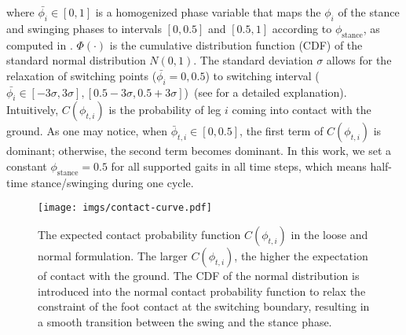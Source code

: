 where $\bar{\phi_i} \in [ 0, 1 ]$ is a homogenized phase variable that maps the $\phi_i$ of the stance and swinging phases to intervals $[0, 0.5]$ and $[0.5, 1]$ according to $\phi_{\text{stance}}$, as computed in . $\Phi(\cdot)$ is the cumulative distribution function (CDF) of the standard normal distribution $N(0, 1)$. The standard deviation $\sigma$ allows for the relaxation of switching points ($\bar{\phi_i} = 0, 0.5$) to switching interval ($\bar{\phi_i} \in [-3 \sigma, 3 \sigma], [0.5 -3 \sigma, 0.5 + 3 \sigma]$)~(see  for a detailed explanation). 
Intuitively, $C(\phi_{t,i})$ is the probability of leg $i$ coming into contact with the ground.
As one may notice, when $\bar{\phi}_{t,i} \in [0, 0.5]$, the first term of $C(\phi_{t,i})$ is dominant; otherwise, the second term becomes dominant.
In this work, we set a constant $\phi_{\text{stance}}=0.5$ for all supported gaits in all time steps, which means half-time stance/swinging during one cycle.
\begin{figure}
    \centering
    \texttt{[image: imgs/contact-curve.pdf]}
    \caption{\small The expected contact probability function $C(\phi_{t,i})$ in the loose and normal formulation. The larger $C(\phi_{t,i})$, the higher the expectation of contact with the ground. The CDF of the normal distribution is introduced into the normal contact probability function to relax the constraint of the foot contact at the switching boundary, resulting in a smooth transition between the swing and the stance phase.}
    \label{fig:contact_curve}
    \vspace{-20pt}
\end{figure}

